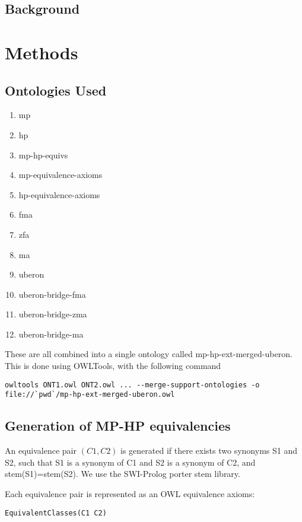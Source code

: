 
\subsection{Background}

\section{Methods}

\subsection{Ontologies Used}

\begin{enumerate}
\item mp
\item hp
\item mp-hp-equivs
\item mp-equivalence-axioms
\item hp-equivalence-axioms
\item fma
\item zfa
\item ma
\item uberon
\item uberon-bridge-fma
\item uberon-bridge-zma
\item uberon-bridge-ma
\end{enumerate}

These are all combined into a single ontology called mp-hp-ext-merged-uberon. This is done using OWLTools, with the following command

\begin{verbatim}
owltools ONT1.owl ONT2.owl ... --merge-support-ontologies -o file://`pwd`/mp-hp-ext-merged-uberon.owl
\end{verbatim}

\subsection{Generation of MP-HP equivalencies}

An equivalence pair $(C1,C2)$ is generated if there exists two
synonyms S1 and S2, such that S1 is a synonym of C1 and S2 is a
synonym of C2, and stem(S1)=stem(S2). We use the SWI-Prolog porter
stem library.

Each equivalence pair is represented as an OWL equivalence axioms:

\begin{verbatim}
EquivalentClasses(C1 C2)
\end{verbatim}

